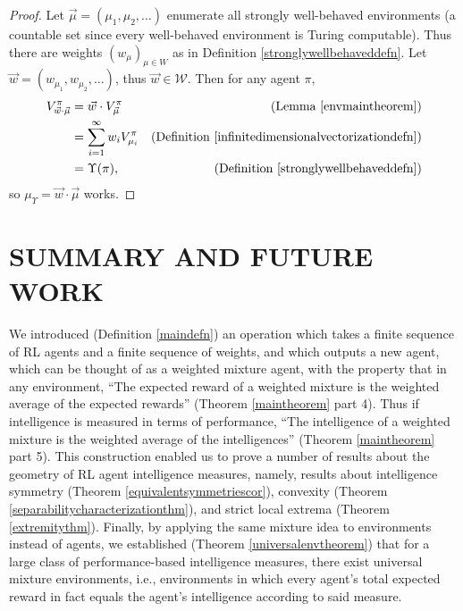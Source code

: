 \documentclass[twoside]{article}
\begin{document}
\begin{proof}
    Let $\vec\mu=(\mu_1,\mu_2,\ldots)$ enumerate all
    strongly well-behaved environments (a countable set since every
    well-behaved environment is Turing computable).
    Thus there are weights $(w_\mu)_{\mu\in W}$ as in Definition \ref{stronglywellbehaveddefn}.
    Let $\vec w=(w_{\mu_1},w_{\mu_2},\ldots)$,
    thus $\vec w\in\mathscr W$.
    Then for any agent $\pi$,
    \begin{align*}
        V^\pi_{\vec w\cdot \vec\mu}
            &= \vec w\cdot V^\pi_{\vec\mu}
                &\mbox{(Lemma \ref{envmaintheorem})}\\
            &= \sum_{i=1}^\infty w_i V^\pi_{\mu_i}
                &\mbox{(Definition \ref{infinitedimensionalvectorizationdefn})}\\
            &= \Upsilon(\pi),
                &\mbox{(Definition \ref{stronglywellbehaveddefn})}
    \end{align*}
    so $\mu_\Upsilon=\vec w\cdot \vec\mu$ works.
\end{proof}

\section{SUMMARY AND FUTURE WORK}

We introduced (Definition \ref{maindefn}) an operation
which takes a finite sequence of RL agents and a
finite sequence of weights, and which outputs a new agent, which can
be thought of as a weighted mixture agent, with the property that
in any environment,
``The expected reward of a weighted mixture is the weighted
average of the expected rewards''
(Theorem \ref{maintheorem} part 4). Thus if intelligence is measured in
terms of performance,
``The intelligence of a weighted mixture is the weighted average
of the intelligences'' (Theorem \ref{maintheorem} part 5).
This construction enabled us to prove a number of results about
the geometry of RL agent intelligence measures, namely, results about
intelligence symmetry (Theorem \ref{equivalentsymmetriescor}),
convexity (Theorem \ref{separabilitycharacterizationthm}),
and strict local extrema (Theorem \ref{extremitythm}).
Finally, by applying the same mixture idea to environments instead of
agents, we established (Theorem \ref{universalenvtheorem})
that for a large class of performance-based
intelligence measures, there exist universal mixture environments,
i.e., environments in which every agent's total expected reward in
fact equals the agent's intelligence according to said measure.
\end{document}
